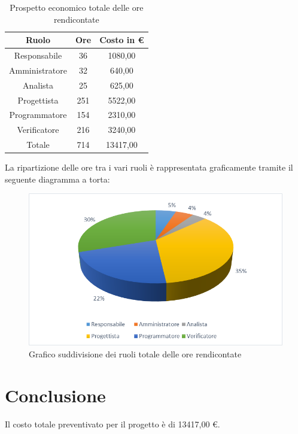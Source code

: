 \documentclass[./PianodiProgetto.tex]{subfiles}
\begin{document}
\begin{table}[H]
	\centering
	\begin{tabular}{|c|c|c|}
		\hline
		Ruolo&Ore&Costo in \euro{} \\ \hline
		Responsabile&36&1080,00 \\ \hline
		Amministratore&32&640,00 \\ \hline
		Analista&25&625,00 \\ \hline
		Progettista&251&5522,00 \\ \hline
		Programmatore&154&2310,00 \\ \hline
		Verificatore&216&3240,00 \\ \hline
		Totale&714&13417,00 \\ \hline
	\end{tabular}
	\caption{Prospetto economico totale delle ore rendicontate}
\end{table}

La ripartizione delle ore tra i vari ruoli è rappresentata graficamente tramite il seguente diagramma a torta:

\begin{figure}[H]
	\centering
	\includegraphics[width=1\linewidth]{img/grafici/OreRendicontateProspettoEconomico}
	\caption{Grafico suddivisione dei ruoli totale delle ore rendicontate}
	\label{fig:ore-rendicontate-prospetto-economico}
\end{figure}

\section{Conclusione}
Il costo totale preventivato per il progetto è di 13417,00 \euro{}.
\end{document}
